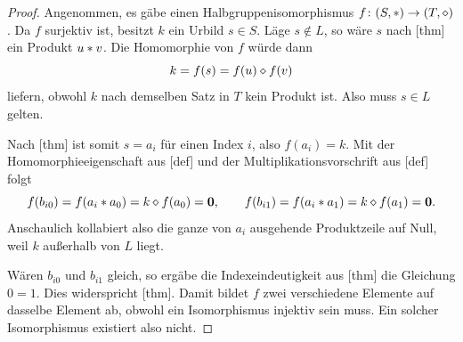 \documentclass[main.tex]{subfiles}
\begin{document}
\MogTableProofHeading
\begin{tabproofwide}
\end{tabproofwide}

\begin{proof}
Angenommen, es gäbe einen Halbgruppenisomorphismus
\(f\colon(S,\mathbin{\ast})\to(T,\mathbin{\diamond})\). Da \(f\) surjektiv ist, besitzt
\(k\) ein Urbild \(s\in S\). Läge \(s\notin L\), so wäre \(s\) nach
[thm] ein Produkt
\(u\mathbin{\ast} v\). Die Homomorphie von \(f\) würde dann
\[
  k=f(s)=f(u)\mathbin{\diamond} f(v)
\]
liefern, obwohl \(k\) nach demselben Satz in \(T\) kein Produkt ist. Also
muss \(s\in L\) gelten.

Nach [thm] ist somit
\(s=a_i\) für einen Index \(i\), also \(f(a_i)=k\). Mit der
Homomorphieeigenschaft aus [def] und der
Multiplikationsvorschrift aus [def]
folgt
\[
  f(b_{i0})
    =f(a_i\mathbin{\ast} a_0)
    =k\mathbin{\diamond} f(a_0)
    =\mathbf0,
  \qquad
  f(b_{i1})
    =f(a_i\mathbin{\ast} a_1)
    =k\mathbin{\diamond} f(a_1)
    =\mathbf0.
\]
Anschaulich kollabiert also die ganze von \(a_i\) ausgehende Produktzeile
auf Null, weil \(k\) außerhalb von \(L\) liegt.

Wären \(b_{i0}\) und \(b_{i1}\) gleich, so ergäbe die Indexeindeutigkeit
aus [thm] die Gleichung
\(0=1\). Dies widerspricht
[thm]. Damit bildet \(f\) zwei verschiedene
Elemente auf dasselbe Element ab, obwohl ein Isomorphismus injektiv sein
muss. Ein solcher Isomorphismus existiert also nicht.
\end{proof}
\end{document}
